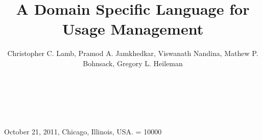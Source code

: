 \documentclass{sig-alternate-11pt}
\begin{document}
\title{A Domain Specific Language for Usage Management}


\author{
\alignauthor
Christopher C. Lamb, Pramod A. Jamkhedkar, Viswanath Nandina, Mathew P. Bohnsack, Gregory L. Heileman \\
       \\
       \\
       \\
}

 {October 21, 2011, Chicago, Illinois, USA.} 
\widowpenalty = 10000

\maketitle









\end{document}
